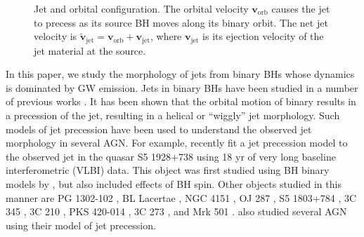 \documentclass[a4paper,fleqn,usenatbib]{mnras}
\begin{document}
\begin{figure}
  \begin{center}
  \end{center}
  \caption{Jet and orbital configuration. The orbital velocity
    $\mathbf{v}_\mathrm{orb}$ causes the jet to precess as its source
    BH moves along its binary orbit. The net jet velocity is
    $\tilde{\mathbf{v}}_\mathrm{jet}={\mathbf{v}}_\mathrm{orb}+{\mathbf{v}}_\mathrm{jet}$,
    where $\mathbf{v}_\mathrm{jet}$ is its ejection velocity of the
    jet material at the source.}
  \label{fig:BH_orbit}
\end{figure}

In this paper, we study the morphology of jets from binary BHs whose
dynamics is dominated by GW emission.  Jets in binary BHs have been
studied in a number of previous works \citep{1980ApJ...238L.129S,
  1981ApJ...246L..65I, 1981ApJ...246L.141H, 1982ApJ...258L..63G,
  1982ApJ...253L...1G, 1982ApJ...262..478G}.  It has been shown that
the orbital motion of binary results in a precession of the jet,
resulting in a helical or ``wiggly'' jet morphology.  Such models of
jet precession have been used to understand the observed jet
morphology in several AGN.  For example, recently
\citet{2014MNRAS.445.1370K} fit a jet precession model to the observed
jet in the quasar S5 1928$+$738 using 18 yr of very long baseline
interferometric (VLBI) data.  This object was first studied using BH
binary models by \citet{1993ApJ...409..130R}, but
\citet{2014MNRAS.445.1370K} also included effects of BH spin.  Other
objects studied in this manner are PG 1302-102
\citep{2015MNRAS.454.1290K, 2015Natur.518...74G}, BL Lacertae
\citep{2003MNRAS.341..405S, 2013MNRAS.428..280C}, NGC 4151
\citep{2012ApJ...759..118B}, OJ 287 \citep{2012MNRAS.421.1861V}, S5
1803$+$784 \citep{2008A&A...483..125R}, 3C 345
\citep{2005A&A...431..831L}, 3C 210 \citep{2004MNRAS.349.1218C}, PKS
420-014 \citep{2001A&A...374..784B}, 3C 273
\citep{2000A&A...360...57R}, and Mrk 501 \citep{1999A&A...347...30V}.
\citet{1982ApJ...262..478G} also studied several AGN using their model
of jet precession.
\end{document}
